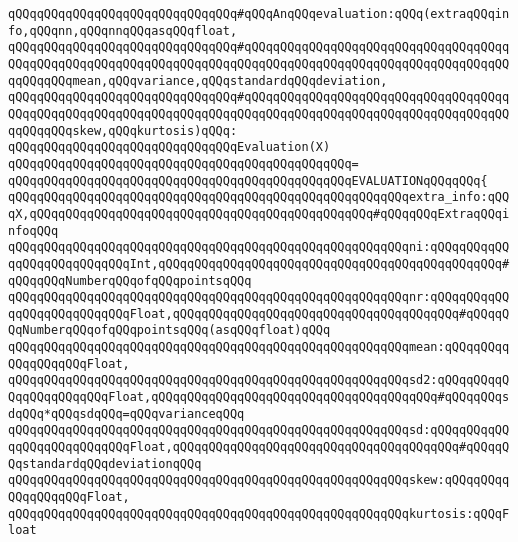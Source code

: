 \newline
\newline
\verb|qQQqqQQqqQQqqQQqqQQqqQQqqQQqqQQq#qQQqAnqQQqevaluation:qQQq(extraqQQqinfo,qQQqnn,qQQqnnqQQqasqQQqfloat,|\newline
\verb|qQQqqQQqqQQqqQQqqQQqqQQqqQQqqQQq#qQQqqQQqqQQqqQQqqQQqqQQqqQQqqQQqqQQqqQQqqQQqqQQqqQQqqQQqqQQqqQQqqQQqqQQqqQQqqQQqqQQqqQQqqQQqqQQqqQQqqQQqqQQqqQQqqQQqmean,qQQqvariance,qQQqstandardqQQqdeviation,|\newline
\verb|qQQqqQQqqQQqqQQqqQQqqQQqqQQqqQQq#qQQqqQQqqQQqqQQqqQQqqQQqqQQqqQQqqQQqqQQqqQQqqQQqqQQqqQQqqQQqqQQqqQQqqQQqqQQqqQQqqQQqqQQqqQQqqQQqqQQqqQQqqQQqqQQqqQQqskew,qQQqkurtosis)qQQq:|\newline
\verb|qQQqqQQqqQQqqQQqqQQqqQQqqQQqqQQqEvaluation(X)|\newline
\verb|qQQqqQQqqQQqqQQqqQQqqQQqqQQqqQQqqQQqqQQqqQQqqQQq=|\newline
\verb|qQQqqQQqqQQqqQQqqQQqqQQqqQQqqQQqqQQqqQQqqQQqqQQqEVALUATIONqQQqqQQq{|\newline
\verb|qQQqqQQqqQQqqQQqqQQqqQQqqQQqqQQqqQQqqQQqqQQqqQQqqQQqqQQqextra_info:qQQqX,qQQqqQQqqQQqqQQqqQQqqQQqqQQqqQQqqQQqqQQqqQQqqQQq#qQQqqQQqExtraqQQqinfoqQQq|\newline
\verb|qQQqqQQqqQQqqQQqqQQqqQQqqQQqqQQqqQQqqQQqqQQqqQQqqQQqqQQqni:qQQqqQQqqQQqqQQqqQQqqQQqqQQqInt,qQQqqQQqqQQqqQQqqQQqqQQqqQQqqQQqqQQqqQQqqQQqqQQq#qQQqqQQqNumberqQQqofqQQqpointsqQQq|\newline
\verb|qQQqqQQqqQQqqQQqqQQqqQQqqQQqqQQqqQQqqQQqqQQqqQQqqQQqqQQqnr:qQQqqQQqqQQqqQQqqQQqqQQqqQQqFloat,qQQqqQQqqQQqqQQqqQQqqQQqqQQqqQQqqQQqqQQq#qQQqqQQqNumberqQQqofqQQqpointsqQQq(asqQQqfloat)qQQq|\newline
\verb|qQQqqQQqqQQqqQQqqQQqqQQqqQQqqQQqqQQqqQQqqQQqqQQqqQQqqQQqmean:qQQqqQQqqQQqqQQqqQQqFloat,|\newline
\verb|qQQqqQQqqQQqqQQqqQQqqQQqqQQqqQQqqQQqqQQqqQQqqQQqqQQqqQQqsd2:qQQqqQQqqQQqqQQqqQQqqQQqFloat,qQQqqQQqqQQqqQQqqQQqqQQqqQQqqQQqqQQqqQQq#qQQqqQQqsdqQQq*qQQqsdqQQq=qQQqvarianceqQQq|\newline
\verb|qQQqqQQqqQQqqQQqqQQqqQQqqQQqqQQqqQQqqQQqqQQqqQQqqQQqqQQqsd:qQQqqQQqqQQqqQQqqQQqqQQqqQQqFloat,qQQqqQQqqQQqqQQqqQQqqQQqqQQqqQQqqQQqqQQq#qQQqqQQqstandardqQQqdeviationqQQq|\newline
\verb|qQQqqQQqqQQqqQQqqQQqqQQqqQQqqQQqqQQqqQQqqQQqqQQqqQQqqQQqskew:qQQqqQQqqQQqqQQqqQQqFloat,|\newline
\verb|qQQqqQQqqQQqqQQqqQQqqQQqqQQqqQQqqQQqqQQqqQQqqQQqqQQqqQQqkurtosis:qQQqFloat|\newline
